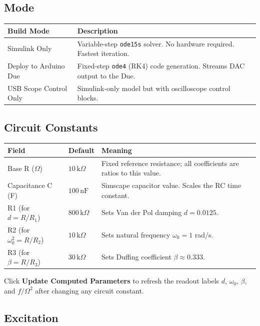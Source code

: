 \documentclass[12pt,a4paper]{article}
\begin{document}
\subsection{Mode}

\begin{center}
\begin{tabular}{lp{9cm}}
\toprule
\textbf{Build Mode} & \textbf{Description}\\
\midrule
Simulink Only          & Variable-step \texttt{ode15s} solver.  No hardware required.  Fastest iteration.\\
Deploy to Arduino Due  & Fixed-step \texttt{ode4} (RK4) code generation.  Streams DAC output to the Due.\\
USB Scope Control Only & Simulink-only model but with oscilloscope control blocks.\\
\bottomrule
\end{tabular}
\end{center}

\subsection{Circuit Constants}

\begin{center}
\begin{tabular}{llp{7cm}}
\toprule
\textbf{Field} & \textbf{Default} & \textbf{Meaning}\\
\midrule
Base R ($\Omega$)       & $10\,\text{k}\Omega$ & Fixed reference resistance; all coefficients are ratios to this value.\\
Capacitance C (F)       & $100\,\text{nF}$    & Simscape capacitor value.  Scales the RC time constant.\\
R1 (for $d=R/R_1$)      & $800\,\text{k}\Omega$ & Sets Van der Pol damping $d=0.0125$.\\
R2 (for $\omega_0^2=R/R_2$) & $10\,\text{k}\Omega$ & Sets natural frequency $\omega_0=1$ rad/s.\\
R3 (for $\beta=R/R_3$)  & $30\,\text{k}\Omega$ & Sets Duffing coefficient $\beta\approx 0.333$.\\
\bottomrule
\end{tabular}
\end{center}

Click \textbf{Update Computed Parameters} to refresh the readout labels $d$, $\omega_0$, $\beta$, and $f/\Omega^2$ after changing any circuit constant.

\subsection{Excitation}
\end{document}
